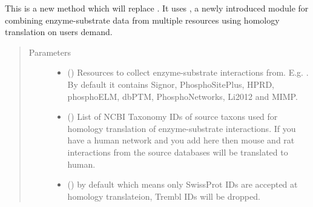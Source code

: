 \documentclass[letterpaper,10pt,english]{sphinxmanual}
\begin{document}
\begin{fulllineitems}

\begin{fulllineitems}
\label{\detokenize{main:pypath.main.PyPath.load_ptms}}
\end{fulllineitems}


\begin{fulllineitems}
\label{\detokenize{main:pypath.main.PyPath.load_ptms2}}
This is a new method which will replace .
It uses , a newly introduced
module for combining enzyme-substrate data from multiple
resources using homology translation on users demand.
\begin{quote}\begin{description}
\item[{Parameters}] \leavevmode\begin{itemize}
\item {} 
 () \textendash{} Resources to collect enzyme-substrate
interactions from. E.g. . By default
it contains Signor, PhosphoSitePlus, HPRD, phosphoELM, dbPTM,
PhosphoNetworks, Li2012 and MIMP.

\item {} 
 () \textendash{} List of NCBI Taxonomy IDs of
source taxons used for homology translation of enzyme-substrate
interactions. If you have a human network and you add here
\sphinxtitleref{{[}10090, 10116{]}} then mouse and rat interactions from the source
databases will be translated to human.

\item {} 
 () \textendash{}  by default which means
only SwissProt IDs are accepted at homology translateion, Trembl
IDs will be dropped.


\end{itemize}
\end{description}
\end{quote}
\end{fulllineitems}
\end{fulllineitems}
\end{document}
